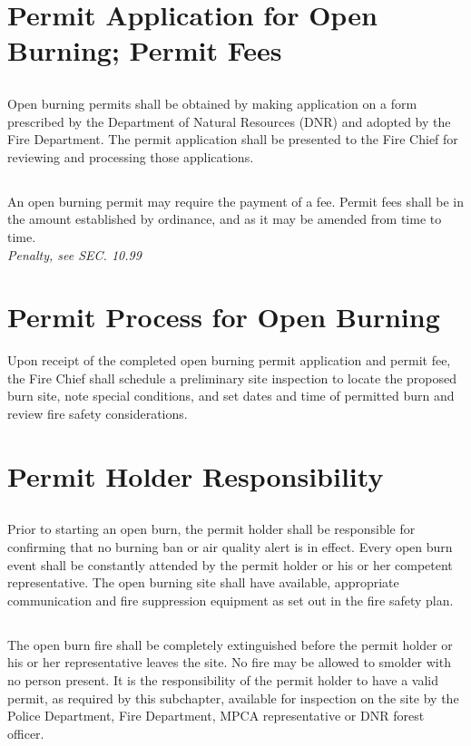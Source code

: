 \section{Permit Application for Open Burning; Permit Fees}
\subsection{}
Open burning permits shall be obtained by making application on a form prescribed by the Department of Natural Resources (DNR) and adopted by the Fire Department.  The permit application shall be presented to the Fire Chief for reviewing and processing those applications.
\subsection{}
An open burning permit may require the payment of a fee.  Permit fees shall be in the amount established by ordinance, and as it may be amended from time to time.\\
\emph{Penalty, see SEC. 10.99}
\section{Permit Process for Open Burning}
Upon receipt of the completed open burning permit application and permit fee, the Fire Chief shall schedule a preliminary site inspection to locate the proposed burn site, note special conditions, and set dates and time of permitted burn and review fire safety considerations.
\section{Permit Holder Responsibility}
\subsection{}
Prior to starting an open burn, the permit holder shall be responsible for confirming that no burning ban or air quality alert is in effect.  Every open burn event shall be constantly attended by the permit holder or his or her competent representative.  The open burning site shall have available, appropriate communication and fire suppression equipment as set out in the fire safety plan.
\subsection{}
The open burn fire shall be completely extinguished before the permit holder or his or her representative leaves the site.  No fire may be allowed to smolder with no person present.  It is the responsibility of the permit holder to have a valid permit, as required by this subchapter, available for inspection on the site by the Police Department, Fire Department, MPCA representative or DNR forest officer.
